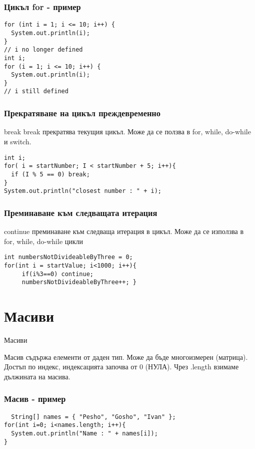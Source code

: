 \documentclass{beamer}
\begin{document}
\begin{frame}[fragile]
  \frametitle{Цикъл for - пример}
\begin{lstlisting}
for (int i = 1; i <= 10; i++) {
  System.out.println(i);
}
// i no longer defined
int i;
for (i = 1; i <= 10; i++) {
  System.out.println(i);
}
// i still defined
\end{lstlisting}
\end{frame}

\begin{frame}[fragile]
  \frametitle{Прекратяване на цикъл преждевременно}
  \transdissolve
  \begin{block}{break}
    break прекратява текущия цикъл. Може
    да се ползва в for, while, do-while и
    switch.
  \end{block}
\begin{lstlisting}
int i;
for( i = startNumber; I < startNumber + 5; i++){
  if (I % 5 == 0) break; 
}
System.out.println("closest number : " + i);
\end{lstlisting}
\end{frame}

\begin{frame}[fragile]
  \frametitle{Преминаване към следващата итерация}
  \transglitter[direction=90]
  \begin{block}{continue}
    преминаване към следваща
    итерация в цикъл. Може да се
    използва в for, while, do-while цикли
  \end{block}
\begin{lstlisting}
int numbersNotDivideableByThree = 0;
for(int i = startValue; i<1000; i++){
     if(i%3==0) continue;
     numbersNotDivideableByThree++; }
\end{lstlisting}
\end{frame}

\section{Масиви}


\begin{frame}{Масиви}
  \begin{block}{Масив}
    съдържа елементи от даден
    тип. Може да бъде многоизмерен
    (матрица). Достъп по индекс,
    индексацията започва от 0 (НУЛА).
    Чрез .length взимаме дължината на
    масива.
  \end{block}
\end{frame}

\begin{frame}[fragile]
  \frametitle{Масив - пример}
\begin{lstlisting}
  String[] names = { "Pesho", "Gosho", "Ivan" };
for(int i=0; i<names.length; i++){
  System.out.println("Name : " + names[i]);
}
\end{lstlisting}
\end{frame}
\end{document}
